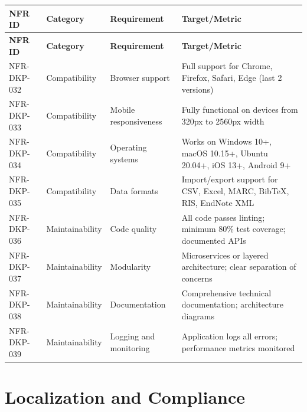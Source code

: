 \documentclass[12pt,a4paper]{report}
\begin{document}
\begin{longtable}{|p{2cm}|p{3cm}|p{5.5cm}|p{3.5cm}|}
\hline
\textbf{NFR ID} & \textbf{Category} & \textbf{Requirement} & \textbf{Target/Metric} \\ \hline
\endfirsthead
\hline
\textbf{NFR ID} & \textbf{Category} & \textbf{Requirement} & \textbf{Target/Metric} \\ \hline
\endhead
NFR-DKP-032 & Compatibility & Browser support & Full support for Chrome, Firefox, Safari, Edge (last 2 versions) \\ \hline
NFR-DKP-033 & Compatibility & Mobile responsiveness & Fully functional on devices from 320px to 2560px width \\ \hline
NFR-DKP-034 & Compatibility & Operating systems & Works on Windows 10+, macOS 10.15+, Ubuntu 20.04+, iOS 13+, Android 9+ \\ \hline
NFR-DKP-035 & Compatibility & Data formats & Import/export support for CSV, Excel, MARC, BibTeX, RIS, EndNote XML \\ \hline
NFR-DKP-036 & Maintainability & Code quality & All code passes linting; minimum 80\% test coverage; documented APIs \\ \hline
NFR-DKP-037 & Maintainability & Modularity & Microservices or layered architecture; clear separation of concerns \\ \hline
NFR-DKP-038 & Maintainability & Documentation & Comprehensive technical documentation; architecture diagrams \\ \hline
NFR-DKP-039 & Maintainability & Logging and monitoring & Application logs all errors; performance metrics monitored \\ \hline
\end{longtable}

\section{Localization and Compliance}
\end{document}
